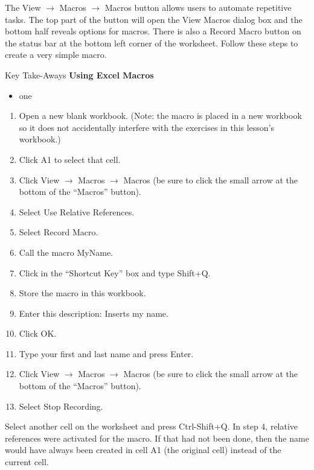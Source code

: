 The View $\rightarrow$ Macros $\rightarrow$ Macros button allows users to automate repetitive tasks. The top part of the button will open the View Macros dialog box and the bottom half reveals options for macros. There is also a Record Macro button on the status bar at the bottom left corner of the worksheet. 
Follow these steps to create a very simple macro.


\begin{center}
	\begin{tkwbox}{Key Take-Aways}
		\textbf{Using Excel Macros}
		\\
		\begin{itemize}
			\setlength{\itemsep}{0pt}
			\setlength{\parskip}{0pt}
			\setlength{\parsep}{0pt}
			
			\item one
			
		\end{itemize}
	\end{tkwbox}
\end{center}

\begin{enumerate}
	\item Open a new blank workbook. (Note: the macro is placed in a new workbook so it does not accidentally interfere with the exercises in this lesson’s workbook.) 
	\item Click A1 to select that cell.
	\item Click View $\rightarrow$ Macros $\rightarrow$ Macros (be sure to click the small arrow at the bottom of the “Macros” button).
	\item Select Use Relative References.
	\item Select Record Macro.
	\item Call the macro MyName.
	\item Click in the “Shortcut Key” box and type Shift+Q.
	\item Store the macro in this workbook.
	\item Enter this description: Inserts my name. 
	\item Click OK.
	\item Type your first and last name and press Enter.
	\item Click View $\rightarrow$ Macros $\rightarrow$ Macros (be sure to click the small arrow at the bottom of the “Macros” button).
	\item Select Stop Recording.
\end{enumerate}

Select another cell on the worksheet and press Ctrl-Shift+Q. In step 4, relative references were activated for the macro. If that had not been done, then the name would have always been created in cell A1 (the original cell) instead of the current cell.


